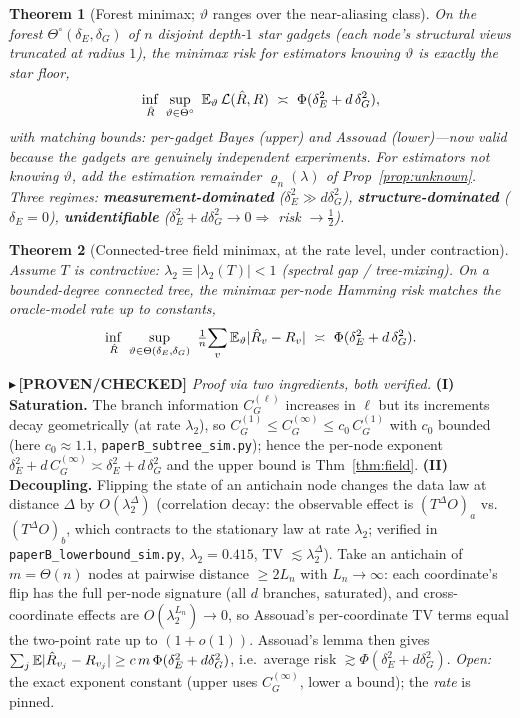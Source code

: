 \documentclass[11pt]{article}
\newtheorem{theorem}{Theorem}
\newcommand{\PROVEN}[1]{{\color{teal}\small$\blacktriangleright$\,\textbf{[PROVEN/CHECKED]} #1}}
\begin{document}
\begin{theorem}[Forest minimax; $\vartheta$ ranges over the near-aliasing class]\label{thm:forest}
On the \emph{forest} $\Theta^\circ(\delta_E,\delta_G)$ of $n$ disjoint depth-$1$ star gadgets (each node's
structural views truncated at radius $1$), the minimax risk for estimators \emph{knowing} $\vartheta$ is
\emph{exactly} the star floor,
\[
   \inf_{\hat R}\ \sup_{\vartheta\in\Theta^\circ}\ \E_\vartheta\,\mathcal L(\hat R,R)\ \asymp\
   \Phi(\delta_E^2+d\,\delta_G^2),
\]
with matching bounds: per-gadget Bayes (upper) and Assouad (lower)---now valid because the gadgets are
\emph{genuinely independent} experiments. For estimators \emph{not} knowing $\vartheta$, add the estimation
remainder $\varrho_n(\lambda)$ of Prop~\ref{prop:unknown}. Three regimes: \textbf{measurement-dominated}
($\delta_E^2\gg d\delta_G^2$), \textbf{structure-dominated} ($\delta_E{=}0$), \textbf{unidentifiable}
($\delta_E^2+d\delta_G^2\to0\Rightarrow$ risk $\to\tfrac12$).
\end{theorem}
\begin{theorem}[Connected-tree field minimax, at the rate level, under contraction]\label{thm:connected}
Assume $T$ is \emph{contractive}: $\lambda_2\equiv|\lambda_2(T)|<1$ (spectral gap / tree-mixing). On a
bounded-degree \emph{connected} tree, the minimax per-node Hamming risk matches the oracle-model rate up to
constants,
\[
   \inf_{\hat R}\ \sup_{\vartheta\in\Theta(\delta_E,\delta_G)}\ \tfrac1n\!\sum_v\E_\vartheta|\hat R_v-R_v|
   \ \asymp\ \Phi(\delta_E^2+d\,\delta_G^2).
\]
\end{theorem}
\PROVEN{\emph{Proof via two ingredients, both verified.} \textbf{(I) Saturation.} The branch information
$C_G^{(\ell)}$ increases in $\ell$ but its increments decay geometrically (at rate $\lambda_2$), so
$C_G^{(1)}\le C_G^{(\infty)}\le c_0\,C_G^{(1)}$ with $c_0$ bounded (here $c_0\!\approx\!1.1$,
\texttt{paperB\_subtree\_sim.py}); hence the per-node exponent $\delta_E^2+d\,C_G^{(\infty)}\asymp\delta_E^2+d\,
\delta_G^2$ and the upper bound is Thm~\ref{thm:field}. \textbf{(II) Decoupling.} Flipping the state of an
antichain node changes the data law at distance $\Delta$ by $O(\lambda_2^{\Delta})$ (correlation decay: the
observable effect is $(T^{\Delta}O)_a$ vs.\ $(T^{\Delta}O)_b$, which contracts to the stationary law at rate
$\lambda_2$; verified in \texttt{paperB\_lowerbound\_sim.py}, $\lambda_2{=}0.415$, TV $\lesssim\lambda_2^\Delta$).
Take an antichain of $m=\Theta(n)$ nodes at pairwise distance $\ge2L_n$ with $L_n\to\infty$: each coordinate's flip
has the full per-node signature (all $d$ branches, saturated), and cross-coordinate effects are $O(\lambda_2^{L_n})
\to0$, so Assouad's per-coordinate TV terms equal the two-point rate up to $(1{+}o(1))$. Assouad's lemma then gives
$\sum_j\mathbb{E}|\hat R_{v_j}-R_{v_j}|\ge c\,m\,\Phi(\delta_E^2+d\delta_G^2)$, i.e.\ average risk $\gtrsim
\Phi(\delta_E^2+d\delta_G^2)$. \emph{Open:} the exact exponent constant (upper uses $C_G^{(\infty)}$, lower a
bound); the \emph{rate} is pinned.}
\end{document}
